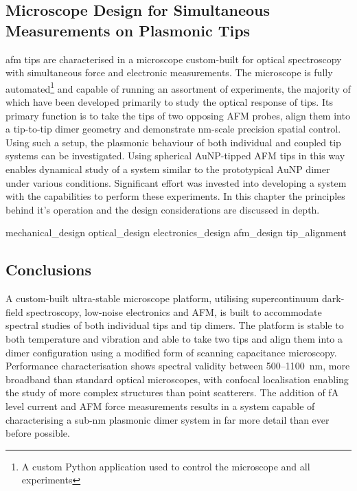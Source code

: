 \documentclass[12pt, a4paper, oneside]{book}
\begin{document}
\begin{singlespace}
{\color{white}
\chapter{Microscope Design for Simultaneous Measurements on Plasmonic Tips}}
\end{singlespace}


\Gls{afm} tips are characterised in a microscope custom-built for optical spectroscopy with simultaneous force and electronic measurements. The microscope is fully automated\footnote{A custom Python application used to control the microscope and all experiments} and capable of running an assortment of experiments, the majority of which have been developed primarily to study the optical response of tips. Its primary function is to take the tips of two opposing AFM probes, align them into a tip-to-tip dimer geometry and demonstrate nm-scale precision spatial control. Using such a setup, the plasmonic behaviour of both individual and coupled tip systems can be investigated. Using spherical AuNP-tipped AFM tips in this way enables dynamical study of a system similar to the prototypical AuNP dimer under various conditions. Significant effort was invested into developing a system with the capabilities to perform these experiments. In this chapter the principles behind it's operation and the design considerations are discussed in depth.

{mechanical_design}
{optical_design}
{electronics_design}
{afm_design}
{tip_alignment}

\section{Conclusions}

A custom-built ultra-stable microscope platform, utilising supercontinuum dark-field spectroscopy, low-noise electronics and AFM, is built to accommodate spectral studies of both individual tips and tip dimers. The platform is stable to both temperature and vibration and able to take two tips and align them into a dimer configuration using a modified form of scanning capacitance microscopy. Performance characterisation shows spectral validity between 500--\SI{1100}{nm}, more broadband than standard optical microscopes, with confocal localisation enabling the study of more complex structures than point scatterers. The addition of \si{fA} level current and AFM force measurements results in a system capable of characterising a sub-nm plasmonic dimer system in far more detail than ever before possible.

\ifstandalone
\begin{singlespace}
\printbibliography[notcategory=fullcited]
\end{singlespace}
\fi
\end{document}
